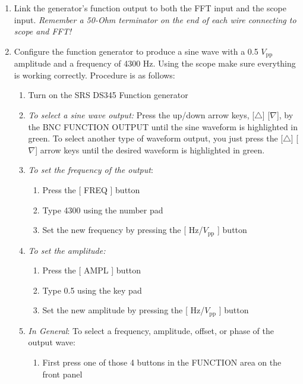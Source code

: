 \documentclass{../lab}
\begin{document}
\begin{enumerate}
    \item Link the generator's function output to both the FFT input and the scope input. \emph{Remember a 50-Ohm terminator on the end of each wire connecting to scope and FFT!}

    \item Configure the function generator to produce a sine wave with a 0.5 $V_\text{pp}$ amplitude and a frequency of 4300 Hz. Using the scope make sure everything is working correctly. Procedure is as follows:
    \begin{enumerate}
        \item Turn on the SRS DS345 Function generator

        \item \emph{To select a sine wave output:} Press the up/down arrow keys, [$\triangle$] [$\nabla$], by the BNC FUNCTION OUTPUT until the sine waveform is highlighted in green. To select another type of waveform output, you just press the [$\triangle$] [$\nabla$] arrow keys until the desired waveform is highlighted in green.

        \item \emph{To set the frequency of the output}:
        \begin{enumerate}
            \item Press the [ FREQ ] button

            \item Type 4300 using the number pad

            \item Set the new frequency by pressing the [ Hz/$V_\text{pp}$ ] button

        \end{enumerate}

        \item \emph{To set the amplitude:}
        \begin{enumerate}
            \item Press the [ AMPL ] button

            \item Type 0.5 using the key pad

            \item Set the new amplitude by pressing the [ Hz/$V_\text{pp}$ ] button

        \end{enumerate}

        \item \emph{In General}: To select a frequency, amplitude, offset, or phase of the output wave:
        \begin{enumerate}
            \item First press one of those 4 buttons in the FUNCTION area on the front panel


\end{enumerate}
\end{enumerate}
\end{enumerate}
\end{document}
